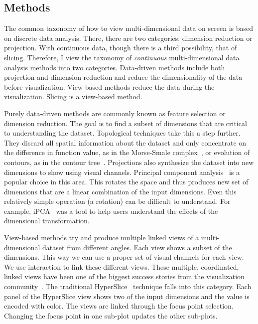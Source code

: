 \subsection{Methods}

The common taxonomy of how to view multi-dimensional data on screen is based on
discrete data analysis. There, there are two categories: dimension reduction or
projection. With continuous data, though there is a third possibility, that of
slicing. Therefore, I view the taxonomy of \emph{continuous} multi-dimensional
data analysis methods into two categories. Data-driven methods include both
projection and dimension reduction and reduce the dimensionality of the data
before visualization. View-based methods reduce the data during the
visualization. Slicing is a view-based method.

Purely data-driven methods are commonly known as feature selection or dimension
reduction. The goal is to find a subset of dimensions that are critical to
understanding the dataset. Topological techniques take this a step further.
They discard all spatial information about the dataset and only concentrate on
the difference in function value, as in the Morse-Smale
complex~\cite{Gyulassy:2012a}, or evolution of contours, as in the contour
tree~\cite{Carr:2003a}.  Projections also synthesize the dataset into new
dimensions to show using visual channels. Principal component
analysis~\cite{Holbrey:2006} is a popular choice in this area. This rotates the
space and thus produces new set of dimensions that are a linear combination of
the input dimensions. Even this relatively simple operation (a rotation) can be
difficult to understand. For example, iPCA~\cite{Jeong:2009a} was a tool to
help users understand the effects of the dimensional transformation.

View-based methods try and produce multiple linked views of a multi-dimensional
dataset from different angles. Each view shows a subset of the dimensions.
This way we can use a proper set of visual channels for each view.  We use
interaction to link these different views. These multiple, coordinated, linked
views have been one of the biggest success stories from the visualization
community~\cite{Rao:1994}. The traditional HyperSlice~\cite{Wijk:1993}
technique falls into this category. Each panel of the HyperSlice view shows two
of the input dimensions and the value is encoded with color.
The views are linked through the focus point selection. Changing the focus point
in one sub-plot updates the other sub-plots.

